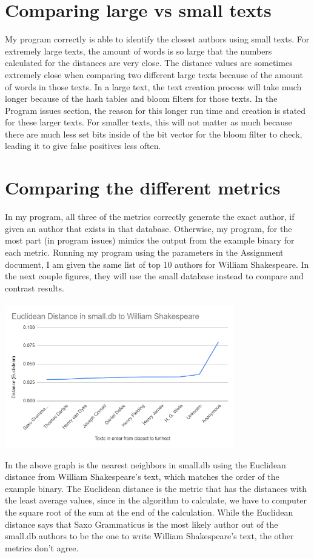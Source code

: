 \documentclass[11pt]{article}
\begin{document}
\section{Comparing large vs small texts}\label{ss:size}
My program correctly is able to identify the closest authors using small texts. For extremely large texts, the amount of words is so large that the numbers calculated for the distances are very close. The distance values are sometimes extremely close when comparing two different large texts because of the amount of words in those texts. In a large text, the text creation process will take much longer because of the hash tables and bloom filters for those texts. In the Program issues section, the reason for this longer run time and creation is stated for these larger texts. For smaller texts, this will not matter as much because there are much less set bits inside of the bit vector for the bloom filter to check, leading it to give false positives less often. 

\section{Comparing the different metrics}\label{ss:metrics}
In my program, all three of the metrics correctly generate the exact author, if given an author that exists in that database. Otherwise, my program, for the most part (in program issues) mimics the output from the example binary for each metric. Running my program using the parameters in the Assignment document, I am given the same list of top 10 authors for William Shakespeare. In the next couple figures, they will use the small database instead to compare and contrast results.
\\ \\
\includegraphics[width = 0.75\textwidth]{Graphs/Euclidean.PNG}

In the above graph is the nearest neighbors in small.db using the Euclidean distance from William Shakespeare's text, which matches the order of the example binary. The Euclidean distance is the metric that has the distances with the least average values, since in the algorithm to calculate, we have to computer the square root of the sum at the end of the calculation. While the Euclidean distance says that Saxo Grammaticus is the most likely author out of the small.db authors to be the one to write William Shakespeare's text, the other metrics don't agree.
\end{document}
